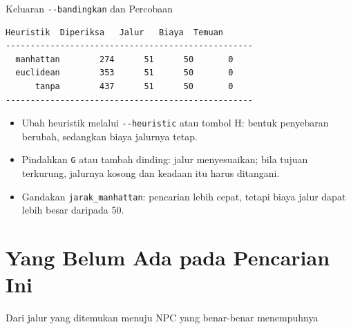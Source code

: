 \documentclass[aspectratio=169,10pt]{beamer}
\begin{document}
\begin{frame}[fragile]{Keluaran \texttt{-{}-bandingkan} dan Percobaan}
\begin{lstlisting}[language={},numbers=none,
  basicstyle=\ttfamily\scriptsize\color{ubCodeText}]
  Heuristik  Diperiksa   Jalur   Biaya  Temuan
--------------------------------------------------
  manhattan        274      51      50       0
  euclidean        353      51      50       0
      tanpa        437      51      50       0
--------------------------------------------------
\end{lstlisting}
\begin{itemize}
  \item Ubah heuristik melalui \texttt{-{}-heuristic} atau tombol H: bentuk
        penyebaran berubah, sedangkan biaya jalurnya tetap.
  \item Pindahkan \texttt{G} atau tambah dinding: jalur menyesuaikan; bila
        tujuan terkurung, jalurnya kosong dan keadaan itu harus ditangani.
  \item Gandakan \texttt{jarak\_manhattan}: pencarian lebih cepat, tetapi
        biaya jalur dapat lebih besar daripada 50.
\end{itemize}
\end{frame}

\section{Yang Belum Ada pada Pencarian Ini}
  {Dari jalur yang ditemukan menuju NPC yang benar-benar menempuhnya}
\end{document}
